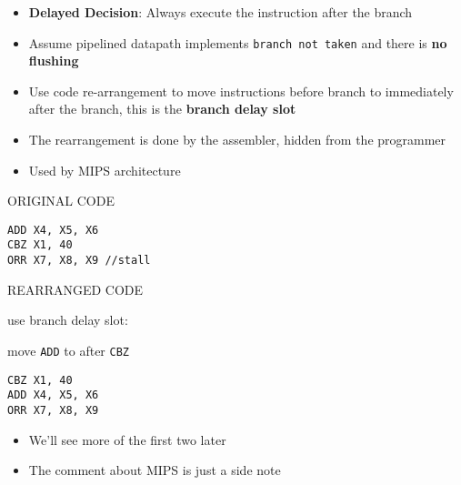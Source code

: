\begin{frame}[fragile]
  \begin{itemize}
  
  \item \textbf{Delayed Decision}: Always execute the instruction after the branch
   
      \item Assume pipelined datapath implements \texttt{branch not taken} and there is \textbf{no flushing}
       \item Use code re-arrangement to move instructions before branch to immediately after the branch, this is the \textbf{branch
      delay slot}
      \item  The rearrangement is done by the assembler, hidden from the programmer
    \item Used by MIPS architecture
        \end{itemize}
\begin{multicols}{2}
ORIGINAL CODE    
{\footnotesize
\begin{verbatim}
ADD X4, X5, X6
CBZ X1, 40
ORR X7, X8, X9 //stall
\end{verbatim}
}

\columnbreak

REARRANGED CODE

use branch delay slot:

move {\tt ADD} to after {\tt CBZ}
{\footnotesize
\begin{verbatim}
CBZ X1, 40
ADD X4, X5, X6 
ORR X7, X8, X9
\end{verbatim} 
}
\end{multicols}
    

  \BNotes\ifnum{}
\begin{itemize}
	\item We'll see more of the first two later
	\item The comment about MIPS is just a side note
\end{itemize}
\fi\ENotes
\end{frame}




